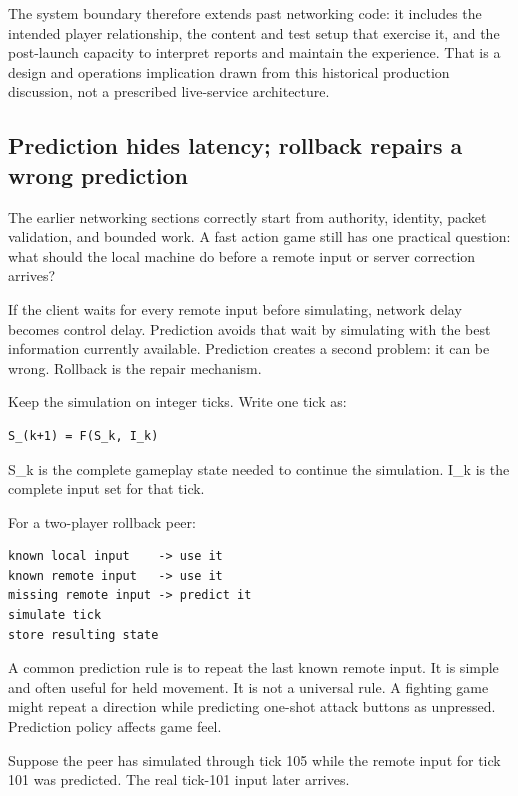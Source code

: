 The system boundary therefore extends past networking code: it includes the intended player relationship, the content and test setup that exercise it, and the post-launch capacity to interpret reports and maintain the experience. That is a design and operations implication drawn from this historical production discussion, not a prescribed live-service architecture.

\subsection{Prediction hides latency; rollback repairs a wrong prediction}\label{06-engine-ii-ch047-prediction-hides-latency-rollback-repairs-a-wrong-prediction}

The earlier networking sections correctly start from authority, identity, packet validation, and bounded work. A fast action game still has one practical question: what should the local machine do before a remote input or server correction arrives?

If the client waits for every remote input before simulating, network delay becomes control delay. Prediction avoids that wait by simulating with the best information currently available. Prediction creates a second problem: it can be wrong. Rollback is the repair mechanism.

Keep the simulation on integer ticks. Write one tick as:

\begin{verbatim}
S_(k+1) = F(S_k, I_k)
\end{verbatim}

S\_k is the complete gameplay state needed to continue the simulation. I\_k is the complete input set for that tick.

For a two-player rollback peer:

\begin{verbatim}
known local input    -> use it
known remote input   -> use it
missing remote input -> predict it
simulate tick
store resulting state
\end{verbatim}

A common prediction rule is to repeat the last known remote input. It is simple and often useful for held movement. It is not a universal rule. A fighting game might repeat a direction while predicting one-shot attack buttons as unpressed. Prediction policy affects game feel.

Suppose the peer has simulated through tick 105 while the remote input for tick 101 was predicted. The real tick-101 input later arrives.

